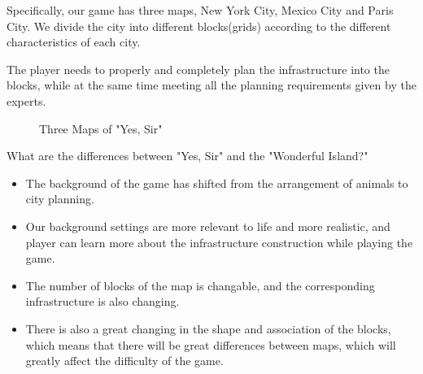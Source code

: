 \documentclass{mcmthesis}
\begin{document}
		Specifically, our game has three maps, New York City, Mexico City and Paris City. We divide the city into different blocks(grids) according to the different characteristics of each city.
		
		The player needs to properly and completely plan the infrastructure into the blocks, while at the same time meeting all the planning requirements given by the experts.
		
		\begin{figure}[htbp]
			\centering
			\centering
			\caption{ Three Maps of "Yes, Sir"}
		\end{figure}
		
		What are the differences between "Yes, Sir" and the "Wonderful Island?"
		
		\begin{itemize}
			\item The background of the game has shifted from the arrangement of animals to city planning.
			
			\item Our background settings are more relevant to life and more realistic, and player can learn more about the infrastructure construction while playing the game.
			
			\item The number of blocks of the map is changable, and the corresponding infrastructure is also changing.
			
			\item There is also a great changing in the shape and association of the blocks, which means that there will be great differences between maps, which will greatly affect the difficulty of the game.
		\end{itemize}
	
		
	
\end{document}

